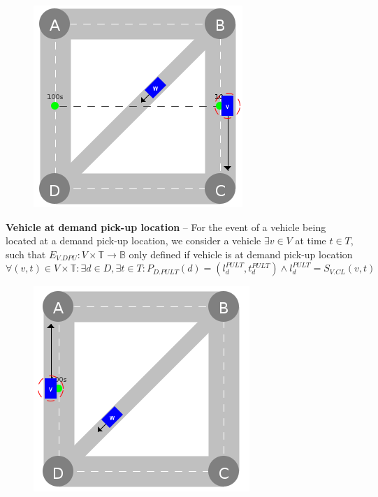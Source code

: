 \documentclass[graybox]{svmult}
\begin{document}
\begin{figure}
	\centering
	\includegraphics[scale=0.35]{../../events/vehicle-at-demand-pick-up.png}
\end{figure}

\noindent
\textbf{Vehicle at demand pick-up location}
--
For the event of a vehicle being located at a demand pick-up location, we consider a vehicle $\exists v \in V$ at time $t \in T$, such that 
$E_{V.DPU}: V \times \mathbb{T} \rightarrow \mathbb{B}$ only defined if vehicle is at demand pick-up location $\forall (v,t) \in V \times \mathbb{T}: \exists d \in D, \exists t \in T: P_{D.PULT}(d) = (l_d^{PULT},t_d^{PULT}) \wedge l_d^{PULT} = S_{V.CL}(v,t)$

\vspace{4mm}

\begin{figure}
	\centering
	\includegraphics[scale=0.35]{../../events/vehicle-at-demand-drop-off.png}
\end{figure}
\end{document}
